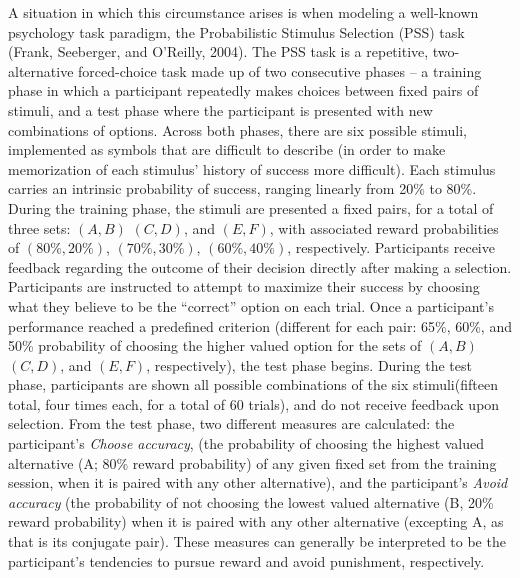 \documentclass[10pt,letterpaper]{article}
\begin{document}
A situation in which this circumstance arises is when modeling a well-known psychology task paradigm, the Probabilistic Stimulus Selection (PSS) task (Frank, Seeberger, and O'Reilly, 2004). The PSS task is a repetitive, two-alternative forced-choice task made up of two consecutive phases – a training phase in which a participant repeatedly makes choices between fixed pairs of stimuli, and a test phase where the participant is presented with new combinations of options. Across both phases, there are six possible stimuli, implemented as symbols that are difficult to describe (in order to make memorization of each stimulus’ history of success more difficult). Each stimulus carries an intrinsic probability of success, ranging linearly from 20\% to 80\%. During the training phase, the stimuli are presented a fixed pairs, for a total of three sets: $(A, B)$  $(C,D)$, and $(E, F)$, with associated reward probabilities of $(80\%, 20\%)$, $(70\%, 30\%)$, $(60\%, 40\%)$, respectively. Participants receive feedback regarding the outcome of their decision directly after making a selection. Participants are instructed to attempt to maximize their success by choosing what they believe to be the “correct” option on each trial. Once a participant’s performance reached a predefined criterion (different for each pair: 65\%, 60\%, and 50\% probability of choosing the higher valued option for the sets of $(A, B)$  $(C,D)$, and $(E, F)$, respectively), the test phase begins. During the test phase, participants are shown all possible combinations of the six stimuli(fifteen total, four times each, for a total of 60 trials), and do not receive feedback upon selection. From the test phase, two different measures are calculated: the participant’s \emph{Choose accuracy}, (the probability of choosing the highest valued alternative (A; 80\% reward probability) of any given fixed set from the training session, when it is paired with any other alternative), and the participant’s \emph{Avoid accuracy} (the probability of not choosing the lowest valued alternative (B, 20\% reward probability) when it is paired with any other alternative (excepting A, as that is its conjugate pair). These measures can generally be interpreted to be the participant’s tendencies to pursue reward and avoid punishment, respectively.
\end{document}
